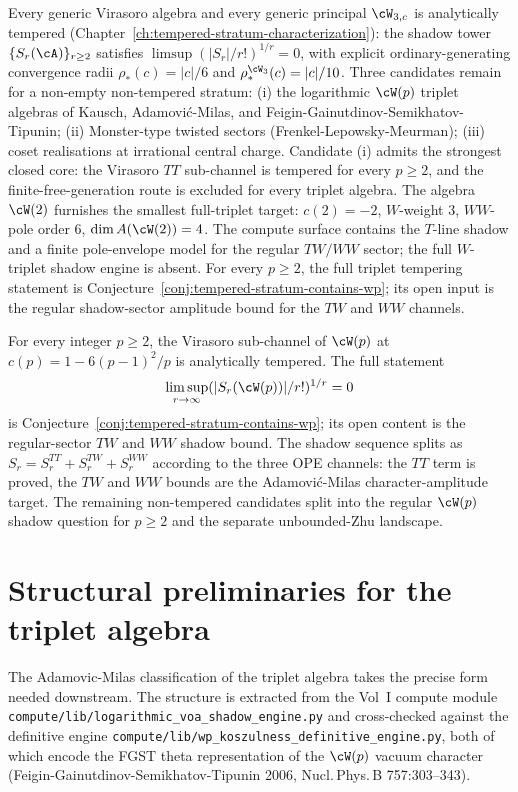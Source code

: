 Every generic Virasoro algebra and every generic principal
$\cW_{3,c}$ is analytically tempered
(Chapter~\ref{ch:tempered-stratum-characterization}): the shadow tower
$\{S_r(\cA)\}_{r \ge 2}$ satisfies
$\limsup (\lvert S_r \rvert / r!)^{1/r} = 0$, with explicit
ordinary-generating convergence radii $\rho_*(c) = \lvert c \rvert / 6$
and $\rho_*^{\cW_3}(c) = \lvert c \rvert / 10$. Three candidates remain
for a non-empty non-tempered stratum: (i) the logarithmic
$\cW(p)$ triplet algebras of Kausch, Adamovi\'c-Milas, and
Feigin-Gainutdinov-Semikhatov-Tipunin; (ii) Monster-type twisted
sectors (Frenkel-Lepowsky-Meurman); (iii) coset realisations at
irrational central charge. Candidate (i) admits the strongest closed
core: the Virasoro $TT$ sub-channel is tempered for every $p \ge 2$,
and the finite-free-generation route is excluded for every triplet
algebra. The algebra $\cW(2)$ furnishes the smallest full-triplet
target: $c(2)=-2$, $W$-weight $3$, $WW$-pole order $6$,
$\dim A(\cW(2))=4$. The compute surface contains the $T$-line shadow
and a finite pole-envelope model for the regular $TW/WW$ sector;
the full $W$-triplet shadow engine is absent. For every $p \ge 2$,
the full triplet tempering statement is
Conjecture~\ref{conj:tempered-stratum-contains-wp}; its open input is
the regular shadow-sector amplitude bound for the $TW$ and $WW$
channels.

For every integer $p \ge 2$, the Virasoro sub-channel of
$\cW(p)$ at $c(p) = 1 - 6(p-1)^2/p$ is analytically tempered. The
full statement
\[
 \limsup_{r \to \infty}(\lvert S_r(\cW(p))\rvert/r!)^{1/r}=0
\]
is Conjecture~\ref{conj:tempered-stratum-contains-wp}; its open
content is the regular-sector $TW$ and $WW$ shadow bound. The shadow
sequence splits as $S_r = S_r^{TT} + S_r^{TW} + S_r^{WW}$ according
to the three OPE channels: the $TT$ term is proved, the $TW$ and
$WW$ bounds are the Adamovi\'c-Milas character-amplitude target.
The remaining non-tempered candidates split into the regular $\cW(p)$
shadow question for $p \ge 2$ and the separate unbounded-Zhu landscape.

\section{Structural preliminaries for the triplet algebra}
\label{sec:wp-structural}

The Adamovic-Milas classification of the triplet algebra takes the
precise form needed downstream. The structure is extracted from the
Vol~I compute module
\texttt{compute/lib/logarithmic\_voa\_shadow\_engine.py} and
cross-checked against the definitive engine
\texttt{compute/lib/wp\_koszulness\_definitive\_engine.py}, both of
which encode the FGST theta representation of the $\cW(p)$ vacuum
character (Feigin-Gainutdinov-Semikhatov-Tipunin 2006,
Nucl.\,Phys.\,B 757:303--343).


